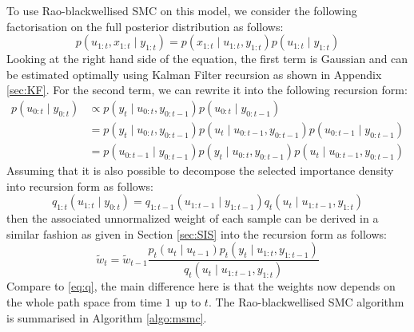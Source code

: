 To use Rao-blackwellised SMC on this model, we consider the following factorisation on the full posterior distribution as follows:
\begin{equation}
  p(u_{1:t}, x_{1:t} \mid y_{1:t}) = p(x_{1:t} \mid u_{1:t}, y_{1:t}) p(u_{1:t} \mid y_{1:t})
\end{equation}
Looking at the right hand side of the equation, the first term is Gaussian and can be estimated optimally using Kalman Filter recursion as shown in Appendix \ref{sec:KF}. For the second term, we can rewrite it into the following recursion form:
\begin{align}
p(u_{0:t} \mid y_{0:t}) &\propto p(y_t \mid u_{0:t}, y_{0:t-1}) p(u_{0:t} \mid y_{0:t-1}) \nonumber \\
&=  p(y_t \mid u_{0:t}, y_{0:t-1}) p(u_t \mid u_{0:t-1}, y_{0:t-1}) p(u_{0:t-1} \mid y_{0:t-1}) \nonumber \\
&=  p(u_{0:t-1} \mid y_{0:t-1}) p(y_t \mid u_{0:t}, y_{0:t-1}) p(u_t \mid u_{0:t-1}, y_{0:t-1})
\label{eq:msmc}
\end{align}
Assuming that it is also possible to decompose the selected importance density into recursion form as follows:
\begin{equation}
        q_{1:t}(u_{1:t} \mid y_{0:t}) = q_{1:t-1}(u_{1:t-1} \mid y_{1:t-1}) q_t(u_t \mid u_{1:t-1}, y_{1:t})
\label{eq:q2}
\end{equation}
then the associated unnormalized weight of each sample can be derived in a similar fashion as given in Section \ref{sec:SIS} into the recursion form as follows:
\begin{equation}
   \tilde{w}_t  = \tilde{w}_{t-1} \dfrac{p_t(u_t \mid u_{t-1})p_t(y_t \mid u_{1:t}, y_{1:t-1})}{q_t(u_t \mid u_{1:t-1}, y_{1:t})}
   \label{eq:wsmsc}
\end{equation}
Compare to \eqref{eq:q}, the main difference here is that the weights now depends on the whole path space from time $1$ up to $t$. The Rao-blackwellised SMC algorithm is summarised in Algorithm \ref{algo:msmc}.

